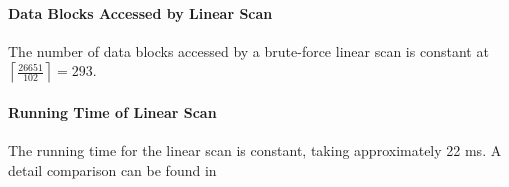 \paragraph{Data Blocks Accessed by Linear Scan} The number of data blocks accessed by a brute-force linear scan is constant at $\left\lceil \frac{26651}{102} \right\rceil = 293$.

\paragraph{Running Time of Linear Scan} The running time for the linear scan is constant, taking approximately 22 ms. A detail comparison can be found in 
